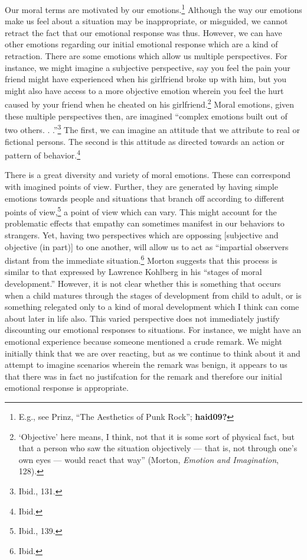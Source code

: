 \documentclass[
  12pt,
]{book}
\theoremstyle{definition}
\theoremstyle{definition}
\theoremstyle{definition}
\theoremstyle{definition}
\theoremstyle{remark}
\begin{document}
Our moral terms are motivated by our emotions.\footnote{E.g., see Prinz, {``The {Aesthetics} of {Punk Rock}''}; \textbf{haid09?}} Although the way our emotions make us feel about a situation may be inappropriate, or misguided, we cannot retract the fact that our emotional response was thus. However, we can have other emotions regarding our initial emotional response which are a kind of retraction. There are some emotions which allow us multiple perspectives. For instance, we might imagine a subjective perspective, say you feel the pain your friend might have experienced when his girlfriend broke up with him, but you might also have access to a more objective emotion wherein you feel the hurt caused by your friend when he cheated on his girlfriend.\footnote{`Objective' here means, I think, not that it is some sort of physical fact, but that a person who saw the situation objectively --- that is, not through one's own eyes --- would react that way'' (Morton, \emph{Emotion and {Imagination}}, 128).} Moral emotions, given these multiple perspectives then, are imagined ``complex emotions built out of two others. . .''\footnote{Ibid., 131.} The first, we can imagine an attitude that we attribute to real or fictional persons. The second is this attitude as directed towards an action or pattern of behavior.\footnote{Ibid.}

There is a great diversity and variety of moral emotions. These can correspond with imagined points of view. Further, they are generated by having simple emotions towards people and situations that branch off according to different points of view,\footnote{Ibid., 139.} a point of view which can vary. This might account for the problematic effects that empathy can sometimes manifest in our behaviors to strangers. Yet, having two perspectives which are oppossing {[}subjective and objective (in part){]} to one another, will allow us to act as ``impartial observers distant from the immediate situation.\footnote{Ibid.} Morton suggests that this process is similar to that expressed by Lawrence Kohlberg in his ``stages of moral development.'' However, it is not clear whether this is something that occurs when a child matures through the stages of development from child to adult, or is something relegated only to a kind of moral development which I think can come about later in life also. This varied perspective does not immediately justify discounting our emotional responses to situations. For instance, we might have an emotional experience because someone mentioned a crude remark. We might initially think that we are over reacting, but as we continue to think about it and attempt to imagine scenarios wherein the remark was benign, it appears to us that there was in fact no justifcation for the remark and therefore our initial emotional response is appropriate.
\end{document}
